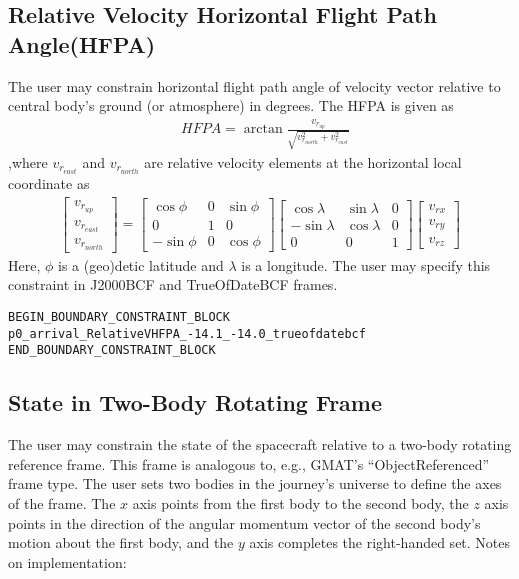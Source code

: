 \documentclass[11pt]{article}
\begin{document}
\subsection{Relative Velocity Horizontal Flight Path Angle(HFPA)}
\label{subsec:relativevelocity_hfpa}
The user may constrain horizontal flight path angle of velocity vector relative to central body's ground (or atmosphere) in degrees. The HFPA is given as
\begin{equation}
	\label{eq:rel_velocity_HFPA}
	\begin{aligned}
		&HFPA = \arctan{\frac{v_{r_{up}}}{\sqrt{v_{r_{north}}^2 + v_{r_{east}}^2}}}
	\end{aligned}
\end{equation}
,where $v_{r_{east}}$ and $v_{r_{north}}$ are relative velocity elements at the horizontal local coordinate as
\begin{equation}
	\label{eq:rel_velocity_local}
	\begin{aligned}
		\begin{bmatrix}
		v_{r_{up}}\\
		v_{r_{east}}\\
		v_{r_{north}}
		\end{bmatrix} =
		\begin{bmatrix}
		\cos{\phi} & 0 & \sin{\phi}\\
		0 & 1 & 0\\
		-\sin{\phi} & 0 & \cos{\phi}
		\end{bmatrix}
		\begin{bmatrix}
		\cos{\lambda} & \sin{\lambda} & 0\\
		-\sin{\lambda}& \cos{\lambda} & 0\\
		0 & 0 & 1
		\end{bmatrix}
		\begin{bmatrix}
		v_{rx}\\
		v_{ry}\\
		v_{rz}
		\end{bmatrix}
	\end{aligned}
\end{equation}
Here, $\phi$ is a (geo)detic latitude and $\lambda$ is a longitude. The user may specify this constraint in J2000BCF and TrueOfDateBCF frames.

\begin{verbatim}
BEGIN_BOUNDARY_CONSTRAINT_BLOCK
p0_arrival_RelativeVHFPA_-14.1_-14.0_trueofdatebcf
END_BOUNDARY_CONSTRAINT_BLOCK
\end{verbatim}

\subsection{State in Two-Body Rotating Frame}
\label{subsec:state_in_two_body_rotating_frame}
The user may constrain the state of the spacecraft relative to a two-body rotating reference frame. This frame is analogous to, e.g., GMAT's ``ObjectReferenced'' frame type. The user sets two bodies in the journey's universe to define the axes of the frame. The $x$ axis points from the first body to the second body, the $z$ axis points in the direction of the angular momentum vector of the second body's motion about the first body, and the $y$ axis completes the right-handed set. Notes on implementation:
\end{document}
